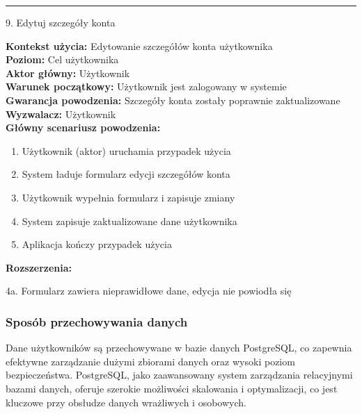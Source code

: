 \noindent\rule{14cm}{0.1pt} %

{\noindent \bf{\large 9. Edytuj szczegóły konta\par}}
\vspace{0.5cm}
{\noindent \bf Kontekst użycia: } Edytowanie szczegółów konta użytkownika\\
{\bf Poziom: } Cel użytkownika\\
{\bf Aktor główny: } Użytkownik\\
{\bf Warunek początkowy: } Użytkownik jest zalogowany w systemie\\
{\bf Gwarancja powodzenia: } Szczegóły konta zostały poprawnie zaktualizowane\\
{\bf Wyzwalacz: } Użytkownik\\
{\bf Główny scenariusz powodzenia: }
\begin{center}
    \begin{enumerate}
        \item Użytkownik (aktor) uruchamia przypadek użycia
        \item System ładuje formularz edycji szczegółów konta
        \item Użytkownik wypełnia formularz i zapisuje zmiany
        \item System zapisuje zaktualizowane dane użytkownika
        \item Aplikacja kończy przypadek użycia
    \end{enumerate}
\end{center}
{\noindent \bf Rozszerzenia: }
\begin{center}
    \begin{description}
        \item{4a.} Formularz zawiera nieprawidłowe dane, edycja nie powiodła się
    \end{description}
\end{center}


\subsubsection{Sposób przechowywania danych}
Dane użytkowników są przechowywane w bazie danych PostgreSQL, co zapewnia efektywne zarządzanie dużymi zbiorami danych oraz wysoki poziom bezpieczeństwa. PostgreSQL, jako zaawansowany system zarządzania relacyjnymi bazami danych, oferuje szerokie możliwości skalowania i optymalizacji, co jest kluczowe przy obsłudze danych wrażliwych i osobowych.

\clearpage

